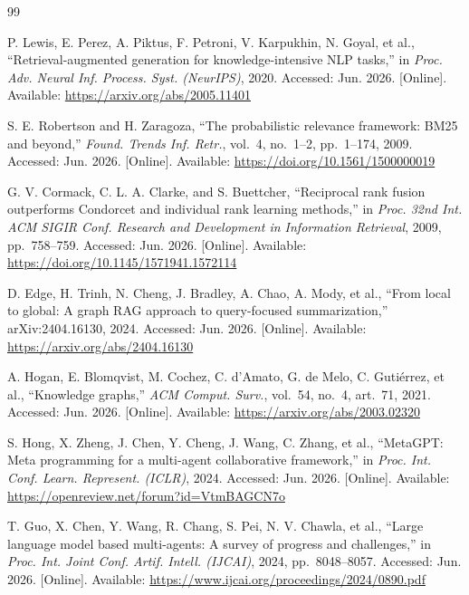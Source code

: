
\begin{thebibliography}{99}

P. Lewis, E. Perez, A. Piktus, F. Petroni, V. Karpukhin, N. Goyal, et al.,
``Retrieval-augmented generation for knowledge-intensive NLP tasks,'' in
\emph{Proc. Adv. Neural Inf. Process. Syst. (NeurIPS)}, 2020. Accessed:
Jun. 2026. [Online]. Available: \url{https://arxiv.org/abs/2005.11401}

S. E. Robertson and H. Zaragoza, ``The probabilistic relevance framework:
BM25 and beyond,'' \emph{Found. Trends Inf. Retr.}, vol.~4, no.~1--2,
pp.~1--174, 2009. Accessed: Jun. 2026. [Online]. Available:
\url{https://doi.org/10.1561/1500000019}

G. V. Cormack, C. L. A. Clarke, and S. Buettcher, ``Reciprocal rank fusion
outperforms Condorcet and individual rank learning methods,'' in
\emph{Proc. 32nd Int. ACM SIGIR Conf. Research and Development in Information
Retrieval}, 2009, pp.~758--759. Accessed: Jun. 2026. [Online]. Available:
\url{https://doi.org/10.1145/1571941.1572114}

D. Edge, H. Trinh, N. Cheng, J. Bradley, A. Chao, A. Mody, et al., ``From
local to global: A graph RAG approach to query-focused summarization,''
arXiv:2404.16130, 2024. Accessed: Jun. 2026. [Online]. Available:
\url{https://arxiv.org/abs/2404.16130}

A. Hogan, E. Blomqvist, M. Cochez, C. d'Amato, G. de Melo, C. Gutiérrez,
et al., ``Knowledge graphs,'' \emph{ACM Comput. Surv.}, vol.~54, no.~4,
art.~71, 2021. Accessed: Jun. 2026. [Online]. Available:
\url{https://arxiv.org/abs/2003.02320}

S. Hong, X. Zheng, J. Chen, Y. Cheng, J. Wang, C. Zhang, et al.,
``MetaGPT: Meta programming for a multi-agent collaborative framework,'' in
\emph{Proc. Int. Conf. Learn. Represent. (ICLR)}, 2024. Accessed:
Jun. 2026. [Online]. Available:
\url{https://openreview.net/forum?id=VtmBAGCN7o}

T. Guo, X. Chen, Y. Wang, R. Chang, S. Pei, N. V. Chawla, et al., ``Large
language model based multi-agents: A survey of progress and challenges,'' in
\emph{Proc. Int. Joint Conf. Artif. Intell. (IJCAI)}, 2024,
pp.~8048--8057. Accessed: Jun. 2026. [Online]. Available:
\url{https://www.ijcai.org/proceedings/2024/0890.pdf}


\end{thebibliography}
